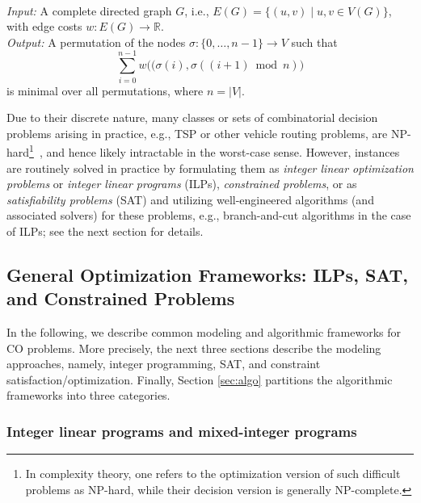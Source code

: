 \documentclass[twoside,11pt]{article}
\begin{document}
\begin{example}\hspace{1pt}\\\label{tspex}\textit{Input:} A complete directed graph $G$, i.e., $E(G) = \{ (u,v) \mid u,v \in V(G) \}$, with edge costs $w\colon E(G) \to \mathbb{R}.$\\ %
	\textit{Output:} A permutation of the nodes $\sigma \colon \{ 0, \dots, n-1 \} \to V$ such that
	\begin{equation*}
		\sum_{i=0}^{n-1} w \big((\sigma{(i)} ,\sigma{((i+1) \bmod n)} \big)
	\end{equation*}
	is minimal over all permutations, where $n = |V|$.
\end{example}
Due to their discrete nature, many classes or sets of combinatorial decision problems arising in practice, e.g., TSP or other vehicle routing problems, are \textsf{NP}-hard\footnote{In complexity theory, one refers to the optimization version of such difficult problems as \textsf{NP}-hard, while their decision version is generally \textsf{NP}-complete.}~\citep{Kor+2012}, and hence likely {intractable} in the worst-case sense. However, instances are routinely solved in practice by formulating them as \emph{integer linear optimization problems} or \emph{integer linear programs} (ILPs), \emph{constrained problems}, or as \emph{satisfiability problems} (SAT) and utilizing well-engineered algorithms (and associated solvers) for these problems, e.g., branch-and-cut algorithms in the case of ILPs; see the next section for details.





\subsection{General Optimization Frameworks: ILPs, SAT, and Constrained Problems}

In the following, we describe common modeling and algorithmic frameworks for CO problems. More precisely, the next three sections describe the modeling approaches, namely, integer programming, SAT, and constraint satisfaction/optimization. Finally, Section \ref{sec:algo} partitions the algorithmic frameworks into three categories.

\subsubsection{Integer linear programs and mixed-integer programs}
\label{sec:ilp}
\end{document}

